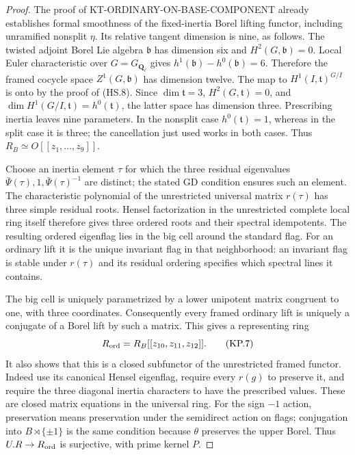 \documentclass[11pt,a4paper]{article}
\theoremstyle{definition}
\begin{document}
\begin{proof}
The proof of KT-ORDINARY-ON-BASE-COMPONENT already establishes
formal smoothness of the fixed-inertia Borel lifting functor,
including unramified nonsplit $\eta$.  Its relative tangent
dimension is nine, as follows.  The twisted adjoint Borel Lie
algebra $\mathfrak b$ has dimension six and $H^2(G,\mathfrak b)=0$.
Local Euler characteristic over $G=G_{\mathbf Q_\ell}$ gives
$h^1(\mathfrak b)-h^0(\mathfrak b)=6$.  Therefore the framed
cocycle space $Z^1(G,\mathfrak b)$ has dimension twelve.
The map to $H^1(I,\mathfrak t)^{G/I}$ is onto by the proof of
(HS.8).  Since $\dim\mathfrak t=3$, $H^2(G,\mathfrak t)=0$,
and $\dim H^1(G/I,\mathfrak t)=h^0(\mathfrak t)$, the latter
space has dimension three.  Prescribing inertia leaves nine
parameters.  In the nonsplit case $h^0(\mathfrak t)=1$, whereas
in the split case it is three; the cancellation just used works
in both cases.  Thus $R_B\simeq O[[z_1,\ldots,z_9]]$.

Choose an inertia element $\tau$ for which the three residual
eigenvalues $\bar\Psi(\tau),1,\bar\Psi(\tau)^{-1}$ are distinct;
the stated GD condition ensures such an element.  The
characteristic polynomial of the unrestricted universal
matrix $r(\tau)$ has three simple residual roots.  Hensel
factorization in the unrestricted complete local ring itself
therefore gives three ordered roots and their spectral
idempotents.  The resulting ordered eigenflag lies in the big
cell around the standard flag.  For an ordinary lift it is the
unique invariant flag in that neighborhood: an invariant flag
is stable under $r(\tau)$ and its residual ordering specifies
which spectral lines it contains.

The big cell is uniquely parametrized by a lower unipotent
matrix congruent to one, with three coordinates.  Consequently
every framed ordinary lift is uniquely a conjugate of a Borel
lift by such a matrix.  This gives a representing ring
\[
              R_{\rm ord}=R_B[[z_{10},z_{11},z_{12}]].        \tag{KP.7}
\]
It also shows that this is a closed subfunctor of the
unrestricted framed functor.  Indeed use its canonical Hensel
eigenflag, require every $r(g)$ to preserve it, and require the
three diagonal inertia characters to have the prescribed
values.  These are closed matrix equations in the universal
ring.  For the sign $-1$ action, preservation means preservation
under the semidirect action on flags; conjugation into
$B\rtimes\{\pm1\}$ is the same condition because $\theta$
preserves the upper Borel.  Thus $U.R\to R_{\rm ord}$ is
surjective, with prime kernel $P$.


\end{proof}
\end{document}
